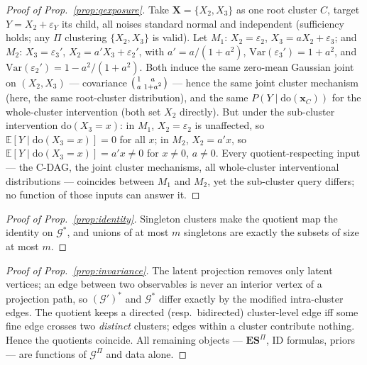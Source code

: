 \documentclass[twoside]{article}
\newcommand{\doo}{\mathrm{do}}
\newcommand{\Gg}{\mathcal{G}}
\newcommand{\Gq}{\mathcal{G}^{\Pi}}
\newcommand{\ESpi}{\mathbf{ES}^{\Pi}}
\begin{document}
\begin{proof}[Proof of Prop.~\ref{prop:qexposure}]
Take $\mathbf{X}=\{X_2,X_3\}$ as one root cluster $C$, target
$Y = X_2 + \varepsilon_Y$ its child, all noises standard normal and
independent (sufficiency holds; any $\Pi$ clustering $\{X_2,X_3\}$ is valid).
Let $M_1$: $X_2=\varepsilon_2$, $X_3 = a X_2 + \varepsilon_3$; and $M_2$:
$X_3=\varepsilon_3'$, $X_2 = a' X_3 + \varepsilon_2'$, with
$a' = a/(1+a^2)$, $\mathrm{Var}(\varepsilon_3') = 1+a^2$, and
$\mathrm{Var}(\varepsilon_2') = 1 - a^2/(1+a^2)$. Both induce the same
zero-mean Gaussian joint on $(X_2,X_3)$ --- covariance
$\begin{psmallmatrix}1 & a\\ a & 1+a^2\end{psmallmatrix}$ --- hence the same
joint cluster mechanism (here, the same root-cluster distribution), and the
same $P(Y\mid\doo(\mathbf{x}_C))$ for the whole-cluster intervention (both
set $X_2$ directly). But under the sub-cluster intervention $\doo(X_3=x)$:
in $M_1$, $X_2=\varepsilon_2$ is unaffected, so
$\mathbb{E}[Y\mid\doo(X_3{=}x)]=0$ for all $x$; in $M_2$,
$X_2 = a'x$, so $\mathbb{E}[Y\mid\doo(X_3{=}x)] = a'x \neq 0$ for
$x\neq 0$, $a\neq 0$. Every quotient-respecting input --- the C-DAG, the
joint cluster mechanisms, all whole-cluster interventional distributions ---
coincides between $M_1$ and $M_2$, yet the sub-cluster query differs;
no function of those inputs can answer it.
\end{proof}

\begin{proof}[Proof of Prop.~\ref{prop:identity}]
Singleton clusters make the quotient map the identity on $\Gg^{*}$, and unions of
at most $m$ singletons are exactly the subsets of size at most $m$.
\end{proof}

\begin{proof}[Proof of Prop.~\ref{prop:invariance}]
The latent projection removes only latent vertices; an edge between two observables
is never an interior vertex of a projection path, so $(\Gg')^{*}$ and $\Gg^{*}$
differ exactly by the modified intra-cluster edges. The quotient keeps a directed
(resp.\ bidirected) cluster-level edge iff some fine edge crosses two \emph{distinct}
clusters; edges within a cluster contribute nothing. Hence the quotients coincide.
All remaining objects --- $\ESpi$, ID formulas, priors --- are functions of $\Gq$
and data alone.
\end{proof}
\end{document}
